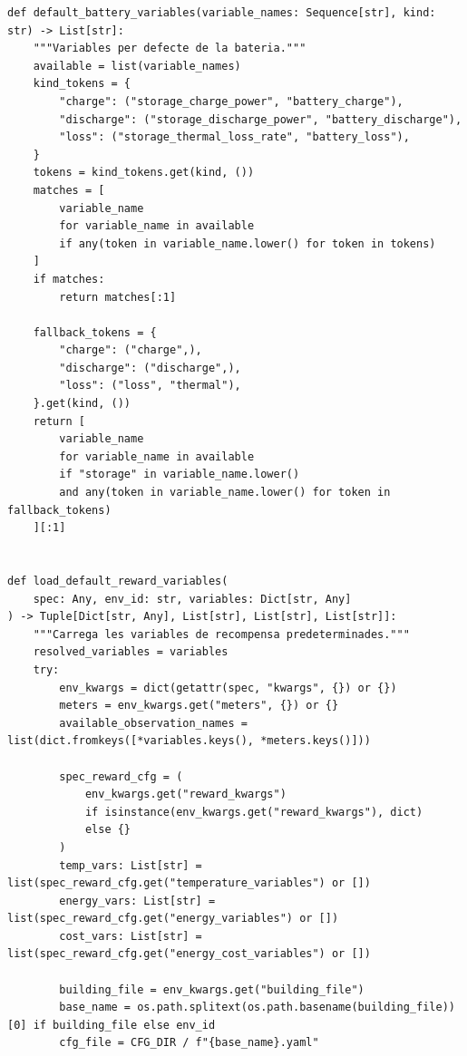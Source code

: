 \documentclass[10pt,a4paper]{article}
\begin{document}
\begin{lstlisting}[style=studioPython,caption={backend/entrenar\_agent\_env.py},label={lst:backend-entrenar-agent-env-py}]
def default_battery_variables(variable_names: Sequence[str], kind: str) -> List[str]:
    """Variables per defecte de la bateria."""
    available = list(variable_names)
    kind_tokens = {
        "charge": ("storage_charge_power", "battery_charge"),
        "discharge": ("storage_discharge_power", "battery_discharge"),
        "loss": ("storage_thermal_loss_rate", "battery_loss"),
    }
    tokens = kind_tokens.get(kind, ())
    matches = [
        variable_name
        for variable_name in available
        if any(token in variable_name.lower() for token in tokens)
    ]
    if matches:
        return matches[:1]

    fallback_tokens = {
        "charge": ("charge",),
        "discharge": ("discharge",),
        "loss": ("loss", "thermal"),
    }.get(kind, ())
    return [
        variable_name
        for variable_name in available
        if "storage" in variable_name.lower()
        and any(token in variable_name.lower() for token in fallback_tokens)
    ][:1]


def load_default_reward_variables(
    spec: Any, env_id: str, variables: Dict[str, Any]
) -> Tuple[Dict[str, Any], List[str], List[str], List[str]]:
    """Carrega les variables de recompensa predeterminades."""
    resolved_variables = variables
    try:
        env_kwargs = dict(getattr(spec, "kwargs", {}) or {})
        meters = env_kwargs.get("meters", {}) or {}
        available_observation_names = list(dict.fromkeys([*variables.keys(), *meters.keys()]))

        spec_reward_cfg = (
            env_kwargs.get("reward_kwargs")
            if isinstance(env_kwargs.get("reward_kwargs"), dict)
            else {}
        )
        temp_vars: List[str] = list(spec_reward_cfg.get("temperature_variables") or [])
        energy_vars: List[str] = list(spec_reward_cfg.get("energy_variables") or [])
        cost_vars: List[str] = list(spec_reward_cfg.get("energy_cost_variables") or [])

        building_file = env_kwargs.get("building_file")
        base_name = os.path.splitext(os.path.basename(building_file))[0] if building_file else env_id
        cfg_file = CFG_DIR / f"{base_name}.yaml"


\end{lstlisting}
\end{document}
